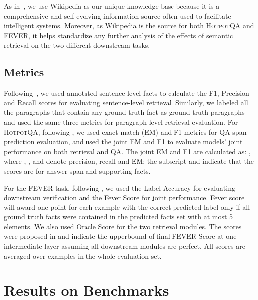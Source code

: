 \documentclass[11pt,a4paper]{article}
\newcommand\fever{FEVER\xspace}
\newcommand\hpqa{\textsc{HotpotQA}\xspace}
\begin{document}
As in~, we use Wikipedia as our unique knowledge base because it is a comprehensive and self-evolving information source often used to facilitate intelligent systems. Moreover, as Wikipedia is the source for both \hpqa and \fever, it helps standardize any further analysis of the effects of semantic retrieval on the two different downstream tasks. 

\subsection{Metrics}
Following~, we used annotated sentence-level facts to calculate the F1, Precision and Recall scores for evaluating sentence-level retrieval. Similarly, we labeled all the paragraphs that contain any ground truth fact as ground truth paragraphs and used the same three metrics for paragraph-level retrieval evaluation. For \hpqa, following , we used exact match (EM) and F1 metrics for QA span prediction evaluation, and used the joint EM and F1 to evaluate models' joint performance on both retrieval and QA. The joint EM and F1 are calculated as: , where , , and  denote precision, recall and EM; the subscript  and  indicate that the scores are for answer span and supporting facts. 

For the \fever task, following , we used the Label Accuracy for evaluating downstream verification and the Fever Score for joint performance. Fever score will award one point for each example with the correct predicted label only if all ground truth facts were contained in the predicted facts set with at most 5 elements. We also used Oracle Score for the two retrieval modules. The scores were proposed in  and indicate the upperbound of final FEVER Score at one intermediate layer assuming all downstream modules are perfect. 
All scores are averaged over examples in the whole evaluation set.



\section{Results on Benchmarks}
\end{document}
